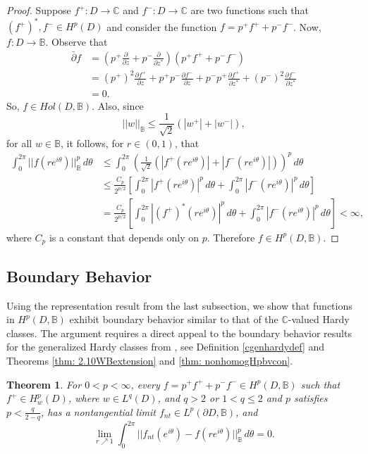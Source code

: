 \documentclass[suppldata]{interact}
\theoremstyle{plain}%
\newtheorem{theorem}{Theorem}[section]
\theoremstyle{definition}
\theoremstyle{remark}
\newcommand{\C}{\mathbb C}
\newcommand{\p}{\partial}
\newcommand{\dbar}{\bar\partial}
\newcommand{\bc}{\mathbb{B}}
\newcommand{\hpb}{H^p(D,\bc)}
\begin{document}
\begin{proof}
    Suppose $f^+:D\to\C$ and $f^-:D\to\C$ are two functions such that $(f^+)^*, f^- \in H^p(D)$ and consider the function $f = p^+ f^+ + p^- f^-$. Now, $f: D \to \bc$. Observe that 
    \begin{align*}
        \dbar f &= \left(p^+ \frac{\p}{\p z} + p^- \frac{\p }{\p z^*}\right)(p^+f^+ + p^- f^-)\\
        &= (p^+)^2 \frac{\p f^+}{\p z} + p^+p^- \frac{\p f^-}{\p z} + p^- p^+ \frac{\p f^+}{\p z^*} + (p^-)^2 \frac{\p f^-}{\p z^*} \\
        &= 0.
    \end{align*}
    So, $f \in Hol(D, \bc)$. Also, since
    \[
    ||w||_{\bc} \leq \frac{1}{\sqrt{2}}(|w^+| + |w^-|),
    \]
    for all $w \in \bc$, it follows, for $r \in (0,1)$, that 
    \begin{align*}
        \int_0^{2\pi} ||f(re^{i\theta})||_{\bc}^p \,d\theta 
        &\leq \int_0^{2\pi} \left( \frac{1}{\sqrt{2}}(|f^+(re^{i\theta})| + |f^-(re^{i\theta})|)\right)^p \,d\theta \\
        &\leq \frac{C_p}{2^{p/2}} \left[ \int_0^{2\pi} |f^+(re^{i\theta})|^p \,d\theta + \int_0^{2\pi} |f^-(re^{i\theta})|^p \,d\theta \right] \\
        &= \frac{C_p}{2^{p/2}} \left[ \int_0^{2\pi} |(f^+)^*(re^{i\theta})|^p \,d\theta + \int_0^{2\pi} |f^-(re^{i\theta})|^p \,d\theta \right]  < \infty,
    \end{align*}
    where $C_p$ is a constant that depends only on $p$. Therefore $f \in \hpb$.

\end{proof}

\subsection{Boundary Behavior}

Using the representation result from the last subsection, we show that functions in $H^p(D,\bc)$ exhibit boundary behavior similar to that of the $\mathbb{C}$-valued Hardy classes. The argument requires a direct appeal to the boundary behavior results for the generalized Hardy classes from \cite{WB}, see Definition \ref{cgenhardydef} and Theorems \ref{thm: 2.10WBextension} and \ref{thm: nonhomogHpbvcon}.

\begin{theorem}\label{bcholobvcon}
    For $0 < p < \infty$, every $f = p^+ f^+ + p^- f^-\in \hpb$ such that $f^+ \in H^p_w(D)$, where $w \in L^q(D)$, and $q >2$ or $1 < q \leq 2$ and $p$ satisfies $p < \frac{q}{2-q}$, has a nontangential limit $f_{nt} \in L^p(\p D, \bc)$, and 
    \[
        \lim_{r \nearrow 1} \int_0^{2\pi} ||f_{nt}(e^{i\theta}) - f(re^{i\theta}) ||^p_{\bc} \, d\theta  = 0. 
    \] 
\end{theorem}
\end{document}

